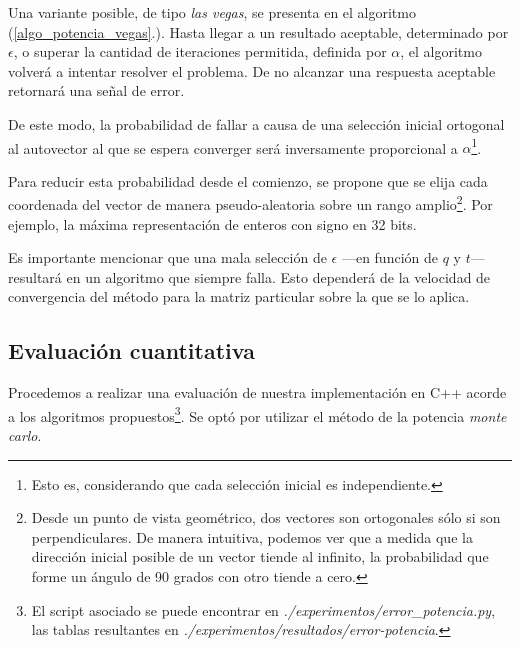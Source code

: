 \vspace{1em}
Una variante posible, de tipo \textit{las vegas}, se presenta en el algoritmo (\ref{algo_potencia_vegas}.). Hasta llegar a un resultado aceptable, determinado por $\epsilon$, o superar la cantidad de iteraciones permitida, definida por $\alpha$, el algoritmo volverá a intentar resolver el problema. De no alcanzar una respuesta aceptable retornará una señal de error. 

De este modo, la probabilidad de fallar a causa de una selección inicial ortogonal al autovector al que se espera converger será inversamente proporcional a $\alpha$\footnote{Esto es, considerando que cada selección inicial es independiente.}. 

\vspace{1em}
Para reducir esta probabilidad desde el comienzo, se propone que se elija cada coordenada del vector de manera pseudo-aleatoria sobre un rango amplio\footnote{Desde un punto de vista geométrico, dos vectores son ortogonales sólo si son perpendiculares. De manera intuitiva, podemos ver que a medida que la dirección inicial posible de un vector tiende al infinito, la probabilidad que forme un ángulo de 90 grados con otro tiende a cero.}. Por ejemplo, la máxima representación de enteros con signo en 32 bits. 

\vspace{1em}


\vspace{1em}
Es importante mencionar que una mala selección de $\epsilon$ ---en función de $q$ y $t$--- resultará en un algoritmo que siempre falla. Esto dependerá de la velocidad de convergencia del método para la matriz particular sobre la que se lo aplica.  




\vspace{2em}
\subsection{Evaluación cuantitativa} Procedemos a realizar una evaluación de nuestra implementación en C++ acorde a los algoritmos propuestos\footnote{El script asociado se puede encontrar en \textit{./experimentos/error\_potencia.py}, las tablas resultantes en \textit{./experimentos/resultados/error-potencia}.}. Se optó por utilizar el método de la potencia \textit{monte carlo}.

